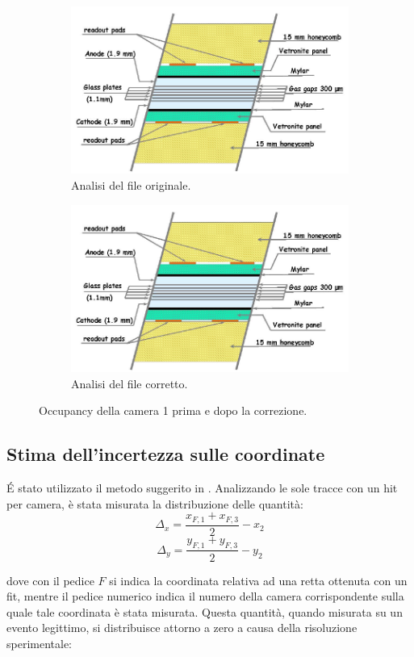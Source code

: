 \documentclass[8pt]{extarticle}
\begin{document}
\begin{figure}
\centering
\begin{subfigure}{.5\textwidth}
  \centering
  \includegraphics[width=.6\linewidth]{mrpc}
  \caption{Analisi del file originale.}
  \label{fig:disxy1_prima}
\end{subfigure}%
\begin{subfigure}{.5\textwidth}
  \centering
  \includegraphics[width=.6\linewidth]{mrpc}
  \caption{Analisi del file corretto.}
  \label{fig:disxy1_dopo}
\end{subfigure}
\caption{Occupancy della camera 1 prima e dopo la correzione.}
\label{fig:disxy1}
\end{figure}

\subsection{Stima dell'incertezza sulle coordinate} \label{subsec:coord_err}
\'E stato utilizzato il metodo suggerito in \cite{articolo_EEE}. Analizzando le sole tracce con un hit per camera, è stata misurata la distribuzione delle quantità: \\

\[ \Delta_x = \frac{x_{F,1} + x_{F,3}}{2} - x_2 \]
\[ \Delta_y = \frac{y_{F,1} + y_{F,3}}{2} - y_2 \]

dove con il pedice $F$ si indica la coordinata relativa ad una retta ottenuta con un fit, mentre il pedice numerico indica il numero della camera corrispondente sulla quale tale coordinata è stata misurata. Questa quantità, quando misurata su un evento legittimo, si distribuisce attorno a zero a causa della risoluzione sperimentale: \\
\end{document}

